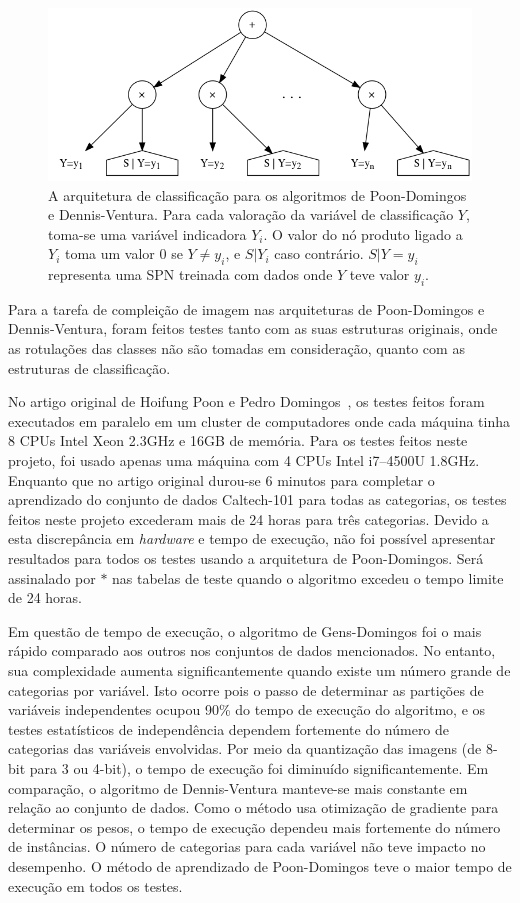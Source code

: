 \documentclass[12pt]{article}
\theoremstyle{plain}
\numberwithin{equation}{section}
\begin{document}
\begin{figure}[h]
  \centering\includegraphics[scale=0.55]{graphs/classarch.png}
  \captionsetup{justification=raggedright}
  \caption{A arquitetura de classificação para os algoritmos de Poon-Domingos e Dennis-Ventura.
    Para cada valoração da variável de classificação $Y$, toma-se uma variável indicadora $Y_i$.
    O valor do nó produto ligado a $Y_i$ toma um valor 0 se $Y\neq y_i$, e $S|Y_i$ caso contrário.
    $S|Y=y_i$ representa uma SPN treinada com dados onde $Y$ teve valor $y_i$.}
\end{figure}

Para a tarefa de compleição de imagem nas arquiteturas de Poon-Domingos e Dennis-Ventura, foram
feitos testes tanto com as suas estruturas originais, onde as rotulações das classes não são
tomadas em consideração, quanto com as estruturas de classificação.

No artigo original de Hoifung Poon e Pedro Domingos~\cite{poon-domingos}, os testes feitos foram
executados em paralelo em um cluster de computadores onde cada máquina tinha 8 CPUs Intel Xeon
2.3GHz e 16GB de memória. Para os testes feitos neste projeto, foi usado apenas uma máquina com 4
CPUs Intel i7--4500U 1.8GHz. Enquanto que no artigo original durou-se 6 minutos para completar o
aprendizado do conjunto de dados Caltech-101 para todas as categorias, os testes feitos neste
projeto excederam mais de 24 horas para três categorias. Devido a esta discrepância em
\textit{hardware} e tempo de execução, não foi possível apresentar resultados para todos os testes
usando a arquitetura de Poon-Domingos. Será assinalado por $\ast$ nas tabelas de teste quando o
algoritmo excedeu o tempo limite de 24 horas.

Em questão de tempo de execução, o algoritmo de Gens-Domingos foi o mais rápido comparado aos
outros nos conjuntos de dados mencionados. No entanto, sua complexidade aumenta significantemente
quando existe um número grande de categorias por variável. Isto ocorre pois o passo de determinar
as partições de variáveis independentes ocupou 90\% do tempo de execução do algoritmo, e os testes
estatísticos de independência dependem fortemente do número de categorias das variáveis envolvidas.
Por meio da quantização das imagens (de 8-bit para 3 ou 4-bit), o tempo de execução foi diminuído
significantemente. Em comparação, o algoritmo de Dennis-Ventura manteve-se mais constante em
relação ao conjunto de dados. Como o método usa otimização de gradiente para determinar os pesos, o
tempo de execução dependeu mais fortemente do número de instâncias. O número de categorias para
cada variável não teve impacto no desempenho. O método de aprendizado de Poon-Domingos teve o maior
tempo de execução em todos os testes.
\end{document}
